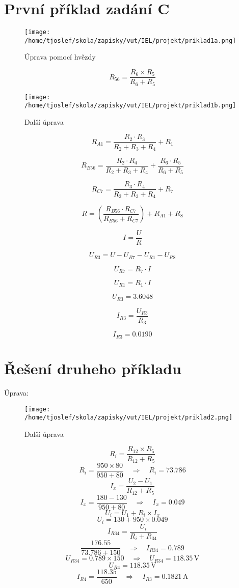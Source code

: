 \documentclass{article}
\begin{document}
\sloppy
\section{První příklad zadání C}

\begin{figure}[!ht]
  \centering
  \texttt{[image: /home/tjoslef/skola/zapisky/vut/IEL/projekt/priklad1a.png]}
  \caption{Úprava pomocí hvězdy}
  \label{fig:hvezda}
\end{figure}

\[
    R_{56} = \frac{R_6 \times R_5}{R_6 + R_5}
\]

\begin{figure}[!ht]
  \centering
  \texttt{[image: /home/tjoslef/skola/zapisky/vut/IEL/projekt/priklad1b.png]}
  \caption{Další úprava}
  \label{fig:dalsi_uprava}
\end{figure}


\[
R_{A1} = \frac{R_2 \cdot R_3}{R_2 + R_3 + R_4} + R_1
\]

\[
R_{B56} = \frac{R_2 \cdot R_4}{R_2 + R_3 + R_4} + \frac{R_6 \cdot R_5}{R_6 + R_5}
\]

\[
R_{C7} = \frac{R_3 \cdot R_4}{R_2 + R_3 + R_4} + R_7
\]

\[
R = \left(\frac{R_{B56} \cdot R_{C7}}{R_{B56} + R_{C7}}\right) + R_{A1} + R_8
\]

\[
I = \frac{U}{R}
\]

\[
U_{R3} = U - U_{R7} - U_{R1} - U_{R8}
\]

\[
U_{R7} = R_7 \cdot I
\]

\[
U_{R1} = R_1 \cdot I
\]

\[
U_{R3} = 3.6048
\]

\[
I_{R3} = \frac{U_{R3}}{R_3}
\]

\[
I_{R3} = 0.0190
\]
\clearpage
\section{Řešení druheho příkladu}
Úprava:

\begin{figure}[!ht]
  \centering
  \texttt{[image: /home/tjoslef/skola/zapisky/vut/IEL/projekt/priklad2.png]}
  \caption{Další úprava}
  \label{fig:upravapriklad2}
\end{figure}

\[
    R_i = \frac{R_{12} \times R_5}{R_{12} + R_5}
\]
\[
    R_i = \frac{950 \times 80}{950 + 80} \quad \Rightarrow \quad R_i = 73.786
\]
\[
    I_x = \frac{U_2 - U_1}{R_{12} + R_5}
\]
\[
    I_x = \frac{180 - 130}{950 + 80} \quad \Rightarrow \quad I_x = 0.049
\]
\[
    U_i = U_1 + R_i \times I_x
\]
\[
    U_i = 130 + 950 \times 0.049
\]
\[
    I_{R34} = \frac{U_i}{R_i + R_{34}}
\]
\[
    \frac{176.55}{73.786 + 150} \quad \Rightarrow \quad I_{R34} = 0.789
\]
\[
    U_{R34} = 0.789 \times 150 \quad \Rightarrow \quad U_{R34} = 118.35 \, \text{V}
\]
\[
    U_{R4} = 118.35 \, \text{V}
\]
\[
    I_{R4} = \frac{118.35}{650} \quad \Rightarrow \quad I_{R3} = 0.1821 \, \text{A}
\]
\end{document}
